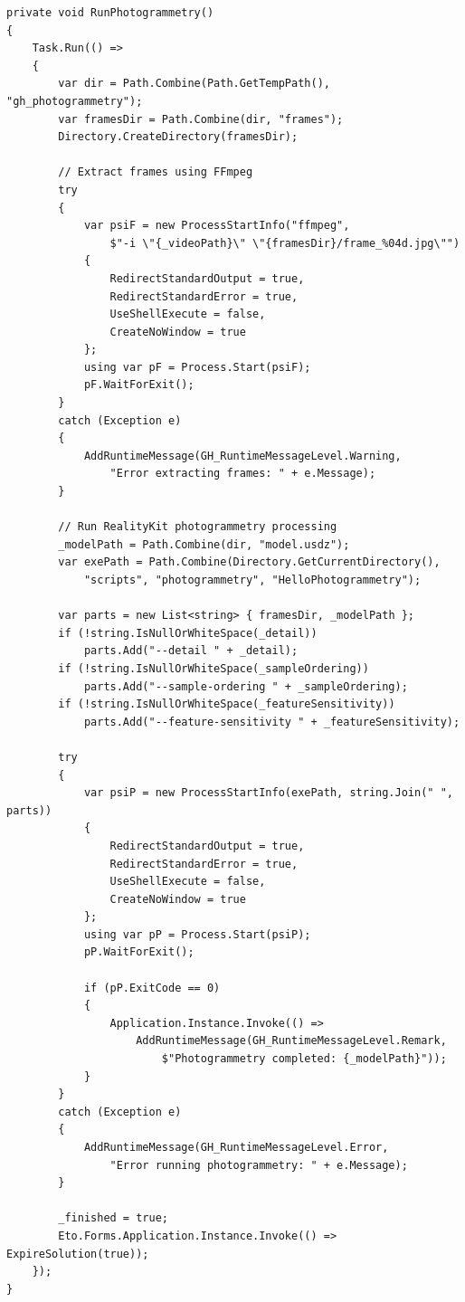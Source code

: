 \begin{verbatim}
private void RunPhotogrammetry()
{
    Task.Run(() =>
    {
        var dir = Path.Combine(Path.GetTempPath(), "gh_photogrammetry");
        var framesDir = Path.Combine(dir, "frames");
        Directory.CreateDirectory(framesDir);
        
        // Extract frames using FFmpeg
        try
        {
            var psiF = new ProcessStartInfo("ffmpeg", 
                $"-i \"{_videoPath}\" \"{framesDir}/frame_%04d.jpg\"")
            {
                RedirectStandardOutput = true,
                RedirectStandardError = true,
                UseShellExecute = false,
                CreateNoWindow = true
            };
            using var pF = Process.Start(psiF);
            pF.WaitForExit();
        }
        catch (Exception e)
        {
            AddRuntimeMessage(GH_RuntimeMessageLevel.Warning, 
                "Error extracting frames: " + e.Message);
        }
        
        // Run RealityKit photogrammetry processing
        _modelPath = Path.Combine(dir, "model.usdz");
        var exePath = Path.Combine(Directory.GetCurrentDirectory(), 
            "scripts", "photogrammetry", "HelloPhotogrammetry");
        
        var parts = new List<string> { framesDir, _modelPath };
        if (!string.IsNullOrWhiteSpace(_detail)) 
            parts.Add("--detail " + _detail);
        if (!string.IsNullOrWhiteSpace(_sampleOrdering)) 
            parts.Add("--sample-ordering " + _sampleOrdering);
        if (!string.IsNullOrWhiteSpace(_featureSensitivity)) 
            parts.Add("--feature-sensitivity " + _featureSensitivity);
        
        try
        {
            var psiP = new ProcessStartInfo(exePath, string.Join(" ", parts))
            {
                RedirectStandardOutput = true,
                RedirectStandardError = true,
                UseShellExecute = false,
                CreateNoWindow = true
            };
            using var pP = Process.Start(psiP);
            pP.WaitForExit();
            
            if (pP.ExitCode == 0)
            {
                Application.Instance.Invoke(() => 
                    AddRuntimeMessage(GH_RuntimeMessageLevel.Remark, 
                        $"Photogrammetry completed: {_modelPath}"));
            }
        }
        catch (Exception e)
        {
            AddRuntimeMessage(GH_RuntimeMessageLevel.Error, 
                "Error running photogrammetry: " + e.Message);
        }
        
        _finished = true;
        Eto.Forms.Application.Instance.Invoke(() => ExpireSolution(true));
    });
}
\end{verbatim}

